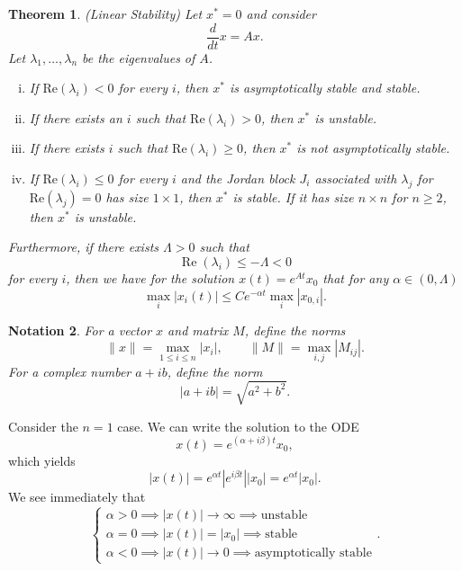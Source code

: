 \documentclass{tufte-handout}
\newtheorem{thm}{Theorem}[subsection]
\newtheorem{notation}[thm]{Notation}
\theoremstyle{definition}
\begin{document}
\begin{thm}
	(Linear Stability) Let $x^* = 0$ and consider \[
		\frac{d}{dt}x = Ax
	.\] Let $\lambda_1,\ldots,\lambda_n$ be the eigenvalues of $A$.

	\begin{enumerate}[(i)]
		\item If $\text{Re} (\lambda_i) < 0$ for every $i$, then $x^*$ is asymptotically stable and stable.
		\item If there exists an $i$ such that $\text{Re} (\lambda_i) > 0$, then $x^*$ is unstable.
		\item If there exists $i$ such that $\text{Re} (\lambda_i) \ge 0$, then $x^*$ is not asymptotically stable.
		\item If $\text{Re} (\lambda_i) \le 0$ for every $i$  and the Jordan block $J_i$ associated with $\lambda_j$ for $\text{Re} (\lambda_j) = 0$ has size $1\times 1$, then $x^*$ is stable. If it has size $n\times n$ for $n \ge 2$, then $x^*$ is unstable.
	\end{enumerate}

	Furthermore, if there exists $\Lambda > 0$ such that \[
		\operatorname{Re}\left(\lambda_i\right) \le -\Lambda < 0
	\] for every $i$, then we have for the solution $x(t) = e^{At} x_0$ that for any $\alpha \in (0,\Lambda)$ \[
		\max_i \left| x_i(t) \right| \le C e^{-\alpha t} \max_i \left| x_{0,i} \right|
	.\] 

\end{thm}

\begin{notation}
	For a vector $x$ and matrix $M$, define the norms \[
		\|x\| = \max_{1 \le i \le n} \left| x_i \right|, \qquad \|M\| = \max_{i,j} \left| M_{ij} \right|
	.\] For a complex number $a + ib$, define the norm \[
		\left| a+ib \right| = \sqrt{a^2 + b^2} 
	.\] 
\end{notation}

 Consider the $n=1$ case. We can write the solution to the ODE \[
	x(t) = e^{(\alpha + i\beta)t}x_0
,\] which yields \[
	\left| x(t) \right| = e^{\alpha t} \left| e^{i\beta t}  \right|\left| x_0 \right| = e^{\alpha t} \left| x_0 \right|
.\] We see immediately that \[
	\begin{cases}
		\alpha > 0 \implies \left| x(t) \right| \to \infty \implies \text{unstable} \\
		\alpha = 0 \implies \left| x(t) \right| = \left| x_0 \right| \implies \text{stable} \\
		\alpha < 0 \implies \left| x(t) \right| \to 0 \implies \text{asymptotically stable}
	\end{cases}
.\] 
\end{document}
